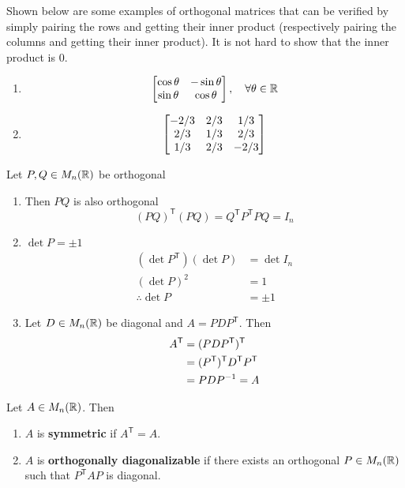 \newpage
\begin{example}
Shown below are some examples of orthogonal matrices that can be verified by simply pairing the rows and getting their inner product (respectively pairing the columns and getting their inner product). It is not hard to show that the inner product is 0.
\leavevmode
\begin{enumerate}
    \item $$\begin{bmatrix} \cos\theta & -\sin\theta \\ \sin\theta & \cos\theta \end{bmatrix}, \quad \forall \theta \in \mathbb{R}$$
    \item $$\begin{bmatrix} -2/3& 2/3 & 1/3 \\ 2/3 & 1/3 & 2/3 \\ 1/3 & 2/3 & -2/3 \end{bmatrix}$$
\end{enumerate}
\end{example}

\begin{remark}
Let $P, Q \in M_n(\mathbb{R})$ be orthogonal
\leavevmode
\begin{enumerate}
    \item Then $PQ$ is also orthogonal
    $$(PQ)^{\mathsf{T}}(PQ) = Q^{\mathsf{T}} P^{\mathsf{T}} PQ = I_n$$
    \item $\det P = \pm 1$
    \begin{align*}
    (\det P^{\mathsf{T}})(\det P) &= \det I_n \\
    (\det P)^2 &= 1 \\
    \therefore \det P &= \pm 1
    \end{align*}
    \item Let $D \in M_n(\mathbb{R})$ be diagonal and $A = PDP^{\mathsf{T}}$. Then
    \begin{align*}
    A^{\mathsf{T}} &= (PDP^{\mathsf{T}})^{\mathsf{T}} \\
    &=(P^{\mathsf{T}})^{\mathsf{T}} D^{\mathsf{T}} P^{\mathsf{T}} \\
    &=PDP^{-1} = A
    \end{align*}
\end{enumerate}
\end{remark}

\begin{definition}\label{def:14.4}
Let $A \in M_n(\mathbb{R})$. Then
\begin{enumerate}
    \item $A$ is \textbf{symmetric} if $A^{\mathsf{T}} = A$.
    \item $A$ is \textbf{orthogonally diagonalizable} if there exists an orthogonal $P \in M_n(\mathbb{R})$ such that $P^{\mathsf{T}} AP$ is diagonal.
\end{enumerate}
\end{definition}

